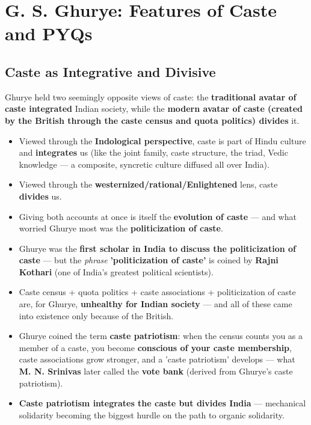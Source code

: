 \chapter{G. S. Ghurye: Features of Caste and PYQs}

\section{Caste as Integrative and Divisive}

Ghurye held two seemingly opposite views of caste: the \textbf{traditional avatar of caste integrated} Indian society, while the \textbf{modern avatar of caste (created by the British through the caste census and quota politics) divides} it.

\begin{KeyConcept}
\begin{itemize}
\item Viewed through the \textbf{Indological perspective}, caste is part of Hindu culture and \textbf{integrates} us (like the joint family, caste structure, the triad, Vedic knowledge --- a composite, syncretic culture diffused all over India).
\item Viewed through the \textbf{westernized/rational/Enlightened} lens, caste \textbf{divides} us.
\item Giving both accounts at once is itself the \textbf{evolution of caste} --- and what worried Ghurye most was the \textbf{politicization of caste}.
\end{itemize}
\end{KeyConcept}

\begin{KeyConcept}
\begin{itemize}
\item Ghurye was the \textbf{first scholar in India to discuss the politicization of caste} --- but the \emph{phrase} \textbf{'politicization of caste'} is coined by \textbf{Rajni Kothari} (one of India's greatest political scientists).
\item Caste census + quota politics + caste associations + politicization of caste are, for Ghurye, \textbf{unhealthy for Indian society} --- and all of these came into existence only because of the British.
\end{itemize}
\end{KeyConcept}

\begin{KeyConcept}
\begin{itemize}
\item Ghurye coined the term \textbf{caste patriotism}: when the census counts you as a member of a caste, you become \textbf{conscious of your caste membership}, caste associations grow stronger, and a 'caste patriotism' develops --- what \textbf{M. N. Srinivas} later called the \textbf{vote bank} (derived from Ghurye's caste patriotism).
\item \textbf{Caste patriotism integrates the caste but divides India} --- mechanical solidarity becoming the biggest hurdle on the path to organic solidarity.
\end{itemize}
\end{KeyConcept}

